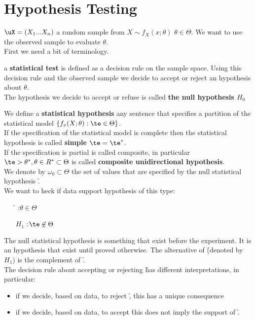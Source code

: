 \chapter{Hypothesis Testing}
\vspace{15pt}

$\uX=(X_1 ... X_n)$ a random sample from $X\sim f_X(x;\theta)$ $\theta \in \Theta$. We want to use the observed sample to evaluate $\theta$.\\
First we need a bit of terminology.
\begin{defi}
	 a \textbf{statistical test} is defined as a decision rule on the sample space. Using this decision rule and the observed sample we decide to accept or reject an hypothesis about $\theta$.\\
	 The hypothesis we decide to accept or refuse is called \textbf{ the null hypothesis $H_0$} 
\end{defi} 
\begin{defi}
	We define a \textbf{statistical hypothesis} any sentence that specifies a partition of the statistical model $\{ f_x(X;\theta): \te \in \Theta \}$.\\If the specification of the statistical model is complete then the statistical hypothesis is called \textbf{simple $\te=\te^*$}.\\If the specification is partial is called composite, in particular $\te >\theta^*, \theta \in R^*\subset \Theta$ is called \textbf{composite unidirectional hypothesis}.\\
	We denote by $\omega_0 \subset \Theta$ the set of values that are specified by the null statistical hypothesis \h .\\
	We want	to heck if data support hypothesis of this type:
	\begin{itemize}
		\item[\h]:$\theta\in \Theta$
		\item[$H_1$]:$\te \not \in \Theta$
	\end{itemize}
\end{defi}
The null statistical hypothesis is something that exist before the experiment. It is an hypothesis that exist until proved otherwise. The alternative of \h (denoted by $H_1$) is the complement of \h.\\ The decision rule about accepting or rejecting \h has different interpretations, in particular:
\begin{itemize}
	\item if we decide, based on data, to reject \h, this has a unique consequence
	\item if we decide, based on data, to accept \h this does not imply the support of \h.
\end{itemize}

